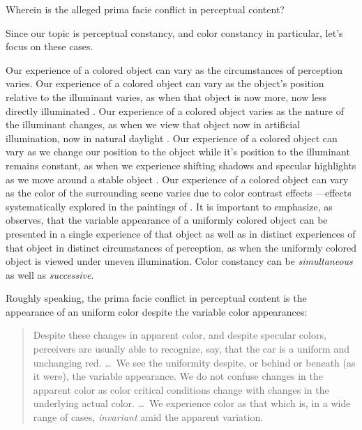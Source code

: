 \documentclass[12pt]{article}
\begin{document}
Wherein is the alleged prima facie conflict in perceptual content?

Since our topic is perceptual constancy, and color constancy in particular, let's focus on these cases.

Our experience of a colored object can vary as the circumstances of perception varies. Our experience of a colored object can vary as the object's position relative to the illuminant varies, as when that object is now more, now less directly illuminated \citep[125]{Noe:2004fk}. Our experience of a colored object varies as the nature of the illuminant changes, as when we view that object now in artificial illumination, now in natural daylight \citep[125]{Noe:2004fk}. Our experience of a colored object can vary as we change our position to the object while it's position to the illuminant remains constant, as when we experience shifting shadows and specular highlights as we move around a stable object \citep[125]{Noe:2004fk}. Our experience of a colored object can vary as the color of the surrounding scene varies due to color contrast effects \citep[125--127]{Noe:2004fk}---effects systematically explored in the paintings of \citet[]{Albers:1963gf}. It is important to emphasize, as \citet[62-63]{Cohen:2008hc} observes, that the variable appearance of a uniformly colored object can be presented in a single experience of that object as well as in distinct experiences of that object in distinct circumstances of perception, as when the uniformly colored object is viewed under uneven illumination. Color constancy can be \emph{simultaneous} as well as \emph{successive}.

Roughly speaking, the prima facie conflict in perceptual content is the appearance of an uniform color despite the variable color appearances:
	\begin{quote}
		Despite these changes in apparent color, and despite specular colors, perceivers are usually able to recognize, say, that the car is a uniform and unchanging red. \ldots\ We see the uniformity despite, or behind or beneath (as it were), the variable appearance. We do not confuse changes in the apparent color as color critical conditions change with changes in the underlying actual color. \ldots\ We experience color as that which is, in a wide range of cases, \emph{invariant} amid the apparent variation. \citep[127]{Noe:2004fk}
	\end{quote}
\end{document}
